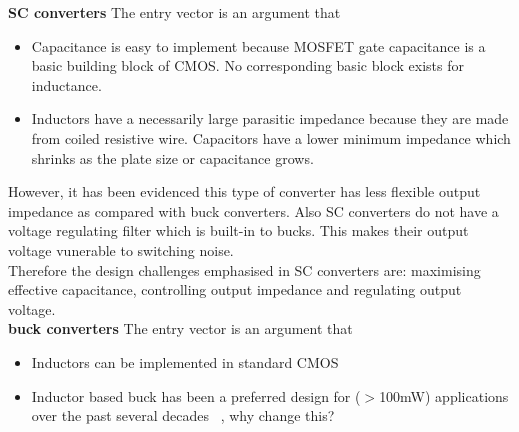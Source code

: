 \documentclass[letterpaper,twocolumn,10pt]{article}
\begin{document}
\indent \textbf{SC converters} The entry vector is an argument that
\begin{itemize}
\item{Capacitance is easy to implement because MOSFET gate capacitance is a basic building block of CMOS. No corresponding basic block exists for inductance.}
\item{Inductors have a necessarily large parasitic impedance because they are made from coiled resistive wire. Capacitors have a lower minimum impedance which shrinks as the plate size or capacitance grows.}
\end{itemize}
 
However, it has been evidenced this type of converter has less flexible output impedance as compared with buck converters. Also SC converters do not have a voltage regulating filter which is built-in to bucks. This makes their output voltage vunerable to switching noise.\\
Therefore the design challenges emphasised in SC converters are: maximising effective capacitance, controlling output impedance and regulating output voltage.\\ 
\textbf{buck converters} The entry vector is an argument that
\begin{itemize}
\item{Inductors can be implemented in standard CMOS} 
\item{Inductor based buck has been a preferred design for ($>$100mW) applications over the past several decades ~\cite{Sanders2010}, why change this?}
\end{itemize}

\end{document}
